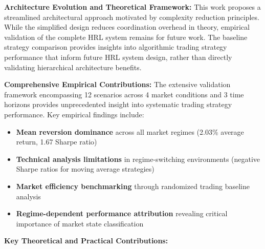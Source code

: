 \documentclass[11pt,a4paper]{article}
\begin{document}
\textbf{Architecture Evolution and Theoretical Framework:}
This work proposes a streamlined architectural approach motivated by complexity reduction principles. While the simplified design reduces coordination overhead in theory, empirical validation of the complete HRL system remains for future work. The baseline strategy comparison provides insights into algorithmic trading strategy performance that inform future HRL system design, rather than directly validating hierarchical architecture benefits.

\textbf{Comprehensive Empirical Contributions:}
The extensive validation framework encompassing 12 scenarios across 4 market conditions and 3 time horizons provides unprecedented insight into systematic trading strategy performance. Key empirical findings include:

\begin{itemize}
\item \textbf{Mean reversion dominance} across all market regimes (2.03\% average return, 1.67 Sharpe ratio)
\item \textbf{Technical analysis limitations} in regime-switching environments (negative Sharpe ratios for moving average strategies)
\item \textbf{Market efficiency benchmarking} through randomized trading baseline analysis
\item \textbf{Regime-dependent performance attribution} revealing critical importance of market state classification

\end{itemize}
\textbf{Key Theoretical and Practical Contributions:}
\end{document}
